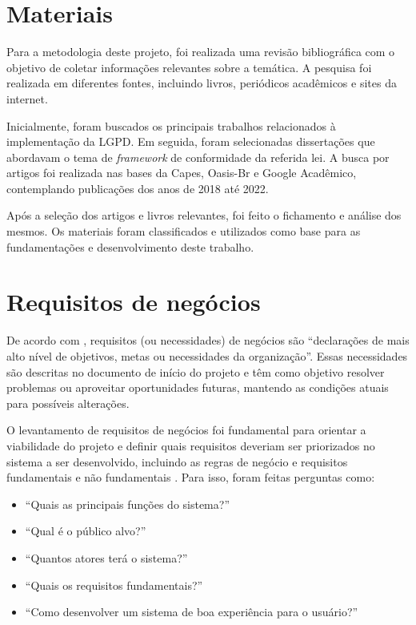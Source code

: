 \documentclass[
	12pt,				%
	openright,			%
	oneside,			%
	a4paper,			%
	english,			%
	french,				%
	spanish,			%
	brazil,				%
	]{abntex2}
\begin{document}
\section{Materiais}

Para a metodologia deste projeto, foi realizada uma revisão bibliográfica com o objetivo de coletar informações relevantes sobre a temática. A pesquisa foi realizada em diferentes fontes, incluindo livros, periódicos acadêmicos e sites da internet.

Inicialmente, foram buscados os principais trabalhos relacionados à implementação da LGPD. Em seguida, foram selecionadas dissertações que abordavam o tema de \textit{framework} de conformidade da referida lei. A busca por artigos foi realizada nas bases da Capes, Oasis-Br e Google Acadêmico, contemplando publicações dos anos de 2018 até 2022.

Após a seleção dos artigos e livros relevantes, foi feito o fichamento e análise dos mesmos. Os materiais foram classificados e utilizados como base para as fundamentações e desenvolvimento deste trabalho.

\section{Requisitos de negócios}

De acordo com , requisitos (ou necessidades) de negócios são “declarações de mais alto nível de objetivos, metas ou necessidades da organização”. Essas necessidades são descritas no documento de início do projeto e têm como objetivo resolver problemas ou aproveitar oportunidades futuras, mantendo as condições atuais para possíveis alterações.

O levantamento de requisitos de negócios foi fundamental para orientar a viabilidade do projeto e definir quais requisitos deveriam ser priorizados no sistema a ser desenvolvido, incluindo as regras de negócio e requisitos fundamentais e não fundamentais \cite{Vazquez2016}. Para isso, foram feitas perguntas como:

\begin{itemize}
\item “Quais as principais funções do sistema?”
\item “Qual é o público alvo?”
\item “Quantos atores terá o sistema?”
\item “Quais os requisitos fundamentais?”
\item “Como desenvolver um sistema de boa experiência para o usuário?”
\end{itemize}
\end{document}
